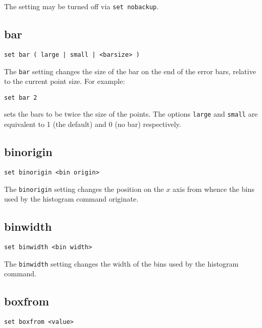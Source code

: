 The setting may be turned off via {\tt set nobackup}.


\subsection{bar}

\begin{verbatim}
set bar ( large | small | <barsize> )
\end{verbatim}

The {\tt bar} setting changes the size of the bar on the end of the error bars,
relative to the current point size.  For example:

\begin{verbatim}
set bar 2
\end{verbatim}

\noindent sets the bars to be twice the size of the points.  The options {\tt large} and
{\tt small} are equivalent to 1 (the default) and 0 (no bar) respectively.

\subsection{binorigin}

\begin{verbatim}
set binorigin <bin origin>
\end{verbatim}

The {\tt binorigin} setting changes the position on the $x$ axis from whence
the bins used by the histogram command originate.

\subsection{binwidth}

\begin{verbatim}
set binwidth <bin width>
\end{verbatim}

The {\tt binwidth} setting changes the width of the bins used by the histogram
command.

\subsection{boxfrom}

\begin{verbatim}
set boxfrom <value>
\end{verbatim}

